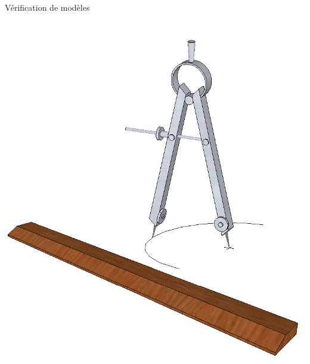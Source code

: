 \begin{frame}{Vérification de modèles}
\begin{columns}
\begin{column}{0.5\textwidth}
      \includegraphics[width=\textwidth]{media/compass_ruler.png}
    \end{column}
  \end{columns}
\end{frame}

